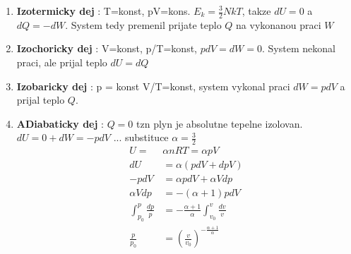 \documentclass{report}
\begin{document}
\begin{enumerate}[label=\bfseries\tiny\protect\circled{\small\arabic*}]
  \item \textbf{Izotermicky dej} : T=konst, pV=kons. $E_k=\frac{3}{2}NkT$, takze $dU=0$ a $dQ=-dW$. System tedy premenil prijate teplo $Q$ na vykonanou praci $W$
  \item \textbf{Izochoricky dej} : V=konst, p/T=konst, $pdV=dW=0$. System nekonal praci, ale prijal teplo $dU=dQ$
  \item \textbf{Izobaricky dej} : p = konst V/T=konst, system vykonal praci $dW=pdV$ a prijal teplo $Q$.
  \item \textbf{ADiabaticky dej} : $Q = 0$ tzn plyn je absolutne tepelne izolovan. \\
      $dU=0+dW=-pdV$ \hspace{5cm} ... substituce $\alpha=\frac{3}{2}$ \\
\begin{align*}
  U=&\alpha nRT=\alpha pV \\
  dU&=\alpha (pdV+dpV) \\
  -pdV&=\alpha pdV+\alpha Vdp \\
  \alpha Vdp&=-(\alpha +1)pdV \\
  \int_{p_0}^{p} \frac{dp}{p}&=-\frac{\alpha+1}{\alpha}\int_{v_0}^{v} \frac{dv}{v} \\
  \frac{p}{p_0}&=(\frac{v}{v_0})^{-\frac{\alpha+1}{\alpha}} \\
\end{align*}
\end{enumerate}

\newpage

\end{document}
